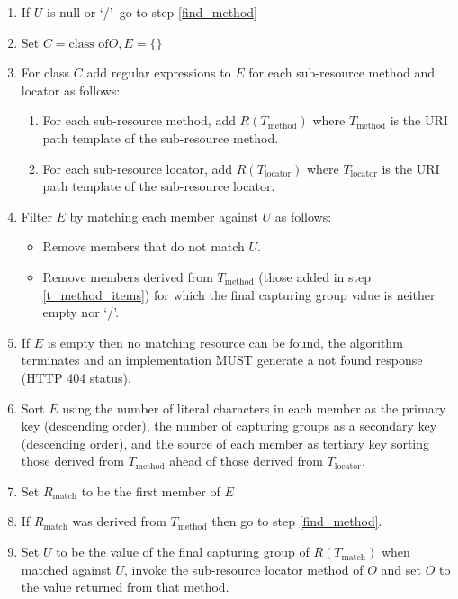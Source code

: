 \begin{enumerate}
\begin{enumerate}
\item \label{check_null} If $U$ is null or \lq/\rq\ go to step \ref{find_method}

\item Set $C=\mbox{class of} O, E=\{\}$

\item For class $C$ add regular expressions to $E$ for each sub-resource method and locator as follows:
\begin{enumerate}
\item \label{t_method_items} For each sub-resource method, add $R(T_{\mbox{method}})$ where $T_{\mbox{method}}$ is the URI path template of the sub-resource method.
\item For each sub-resource locator, add $R(T_{\mbox{locator}})$ where $T_{\mbox{locator}}$ is the  URI path template of the sub-resource locator.
\end{enumerate}

\item Filter $E$ by matching each member against $U$ as follows:
\begin{itemize}
\item Remove members that do not match $U$.
\item Remove members derived from $T_{\mbox{method}}$ (those added in step \ref{t_method_items}) for which the final capturing group value is neither empty nor \lq/\rq.
\end{itemize}

\item If $E$ is empty then no matching resource can be found, the algorithm terminates and an implementation MUST generate a not found response (HTTP 404 status).

\item Sort $E$ using the number of literal characters in each member as the primary key (descending order), the number of capturing groups as a secondary key (descending order), and the source of each member as tertiary key sorting those derived from $T_{\mbox{method}}$ ahead of those derived from $T_{\mbox{locator}}$.

\item Set $R_{\mbox{match}}$ to be the first member of $E$

\item If $R_{\mbox{match}}$ was derived from $T_{\mbox{method}}$ then go to step \ref{find_method}.

\item Set $U$ to be the value of the final capturing group of $R(T_{\mbox{match}})$ when matched against $U$,  invoke the sub-resource locator method of $O$ and set $O$ to the value returned from that method.


\end{enumerate}
\end{enumerate}
